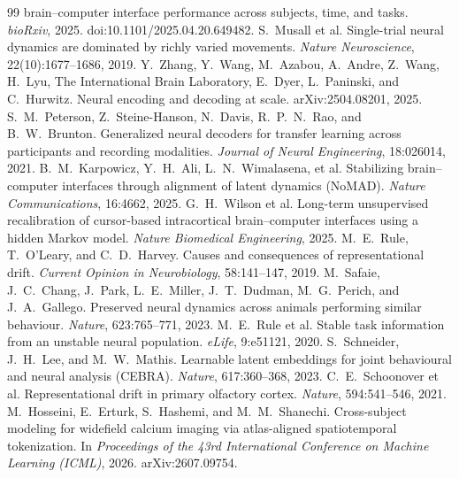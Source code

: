 \documentclass{article}
\begin{document}
\begin{thebibliography}{99}
brain--computer interface performance across subjects, time, and tasks. \emph{bioRxiv}, 2025.
doi:10.1101/2025.04.20.649482.
 S.~Musall et al. Single-trial neural dynamics are
dominated by richly varied movements. \emph{Nature Neuroscience}, 22(10):1677--1686, 2019.
 Y.~Zhang, Y.~Wang, M.~Azabou, A.~Andre, Z.~Wang, H.~Lyu,
The International Brain Laboratory, E.~Dyer, L.~Paninski, and C.~Hurwitz. Neural encoding and
decoding at scale. arXiv:2504.08201, 2025.
 S.~M.~Peterson, Z.~Steine-Hanson, N.~Davis,
R.~P.~N.~Rao, and B.~W.~Brunton. Generalized neural decoders for transfer learning across
participants and recording modalities. \emph{Journal of Neural Engineering}, 18:026014, 2021.
 B.~M.~Karpowicz, Y.~H.~Ali, L.~N.~Wimalasena,
et al. Stabilizing brain--computer interfaces through alignment of latent dynamics (NoMAD).
\emph{Nature Communications}, 16:4662, 2025.
 G.~H.~Wilson et al. Long-term unsupervised recalibration
of cursor-based intracortical brain--computer interfaces using a hidden Markov model. \emph{Nature
Biomedical Engineering}, 2025.
 M.~E.~Rule, T.~O'Leary, and C.~D.~Harvey. Causes and
consequences of representational drift. \emph{Current Opinion in Neurobiology}, 58:141--147, 2019.
 M.~Safaie, J.~C.~Chang, J.~Park, L.~E.~Miller,
J.~T.~Dudman, M.~G.~Perich, and J.~A.~Gallego. Preserved neural dynamics across animals performing
similar behaviour. \emph{Nature}, 623:765--771, 2023.
 M.~E.~Rule et al. Stable task information from an unstable
neural population. \emph{eLife}, 9:e51121, 2020.
 S.~Schneider, J.~H.~Lee, and M.~W.~Mathis.
Learnable latent embeddings for joint behavioural and neural analysis (CEBRA). \emph{Nature},
617:360--368, 2023.
 C.~E.~Schoonover et al. Representational drift in
primary olfactory cortex. \emph{Nature}, 594:541--546, 2021.
 M.~Hosseini, E.~Erturk, S.~Hashemi, and M.~M.~Shanechi.
Cross-subject modeling for widefield calcium imaging via atlas-aligned spatiotemporal tokenization.
In \emph{Proceedings of the 43rd International Conference on Machine Learning (ICML)}, 2026.
arXiv:2607.09754.
\end{thebibliography}
\end{document}
